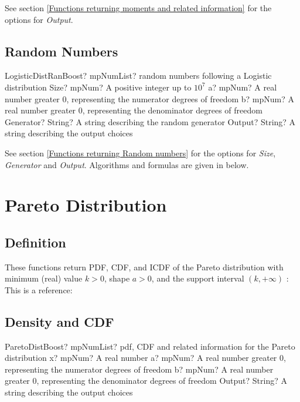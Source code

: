\vspace{0.3cm}

See section \ref{Functions returning moments and related information} for the options for {\itshape\sffamily Output}. 



\subsection{Random Numbers}

\begin{mpFunctionsExtract}
	\mpFunctionFiveNotImplemented
	{LogisticDistRanBoost? mpNumList? random numbers following a Logistic distribution}
	{Size? mpNum? A positive integer up to $10^7$}
	{a? mpNum? A real number greater 0, representing the numerator  degrees of freedom}
	{b? mpNum? A real number greater 0, representing the denominator degrees of freedom}
	{Generator? String? A string describing the random generator}
	{Output? String? A string describing the output choices}
\end{mpFunctionsExtract}

\vspace{0.3cm}

See section \ref{Functions returning Random numbers} for the options for  {\itshape\sffamily Size},  {\itshape\sffamily Generator} and {\itshape\sffamily Output}. Algorithms and formulas are given in below.




\newpage
\section{Pareto Distribution}

\subsection{Definition}
These functions return PDF, CDF, and ICDF of the Pareto distribution with minimum
(real) value $k > 0$, shape $a > 0$, and the support interval $(k,+\infty)$ :
This is a reference: \cite{wiki_Pareto}


\subsection{Density and CDF}
\begin{mpFunctionsExtract}
	\mpFunctionFourNotImplemented
	{ParetoDistBoost? mpNumList? pdf, CDF and related information for the Pareto distribution}
	{x? mpNum? A real number}
	{a? mpNum? A real number greater 0, representing the numerator  degrees of freedom}
	{b? mpNum? A real number greater 0, representing the denominator degrees of freedom}
	{Output? String? A string describing the output choices}
\end{mpFunctionsExtract}

